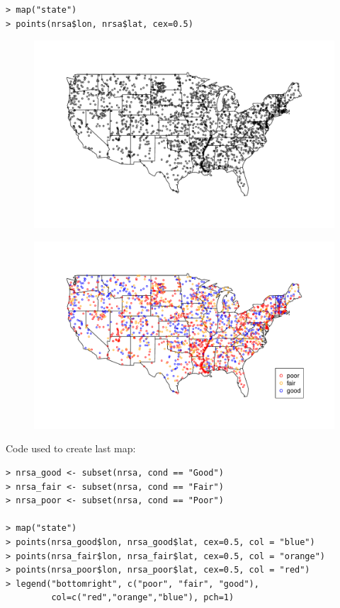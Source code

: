 \documentclass[10pt]{beamer}
\begin{document}
\begin{frame}[fragile]
\small
\begin{verbatim}
> map("state")
> points(nrsa$lon, nrsa$lat, cex=0.5)
\end{verbatim}
\begin{figure}[htbp]
\centering
\includegraphics[scale=0.6]{figure/nrsamap0.pdf}
\end{figure}
\end{frame}


\begin{frame}[fragile]
\begin{figure}[htbp]
\centering
\includegraphics[scale=0.6]{figure/nrsamap.pdf}
\end{figure}
\end{frame}

\begin{frame}[fragile]
Code used to create last map:
\small
\begin{verbatim}
> nrsa_good <- subset(nrsa, cond == "Good")
> nrsa_fair <- subset(nrsa, cond == "Fair")
> nrsa_poor <- subset(nrsa, cond == "Poor")

> map("state")
> points(nrsa_good$lon, nrsa_good$lat, cex=0.5, col = "blue")
> points(nrsa_fair$lon, nrsa_fair$lat, cex=0.5, col = "orange")
> points(nrsa_poor$lon, nrsa_poor$lat, cex=0.5, col = "red")
> legend("bottomright", c("poor", "fair", "good"), 
         col=c("red","orange","blue"), pch=1)
\end{verbatim}
\end{frame}
\end{document}
